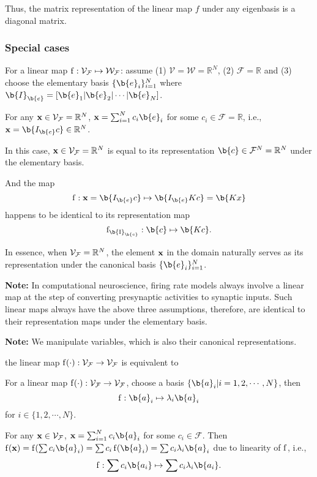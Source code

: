 Thus, the matrix representation of the linear map $f$ under any eigenbasis is a diagonal matrix.



\subsubsection{Special cases}

For a linear map $\operatorname{f}: \mathcal{V}_{\mathcal{F}} \mapsto \mathcal{W}_{\mathcal{F}}$: assume (1) $\mathcal{V} = \mathcal{W} = \mathbb{R}^N$, (2) $\mathcal{F} = \mathbb{R}$ and (3) choose the elementary basis $\{\b{e}_i\}_{i=1}^N$ where $\b{I}_{\b{e}} = \left[\b{e}_1 | \b{e}_2 | \cdots | \b{e}_N \right]$.

For any $\mathbf{x} \in \mathcal{V}_{\mathcal{F}} = \mathbb{R}^N$, $\x =\sum_{i=1}^{N} c_i\b{e}_i$ for some $c_i \in \mathcal{F} = \mathbb{R}$, i.e., $\x = \b{I_{\b{e}}c} \in \mathbb{R}^N$. 
    
In this case, $\mathbf{x} \in \mathcal{V}_{\mathcal{F}} = \mathbb{R}^N$ is equal to its representation $\b{c} \in \mathcal{F}^N = \mathbb{R}^N$ under the elementary basis.  
    
And the map
$$\f: \x = \b{I_{\b{e}}c} \mapsto  \b{I_{\b{e}}Kc} = \b{Kx}$$
happens to be identical to its representation map
$$\operatorname{f_{\b{I}_{\b{e}}}}: \b{c} \mapsto  \b{Kc}.$$
    
In essence, when $\mathcal{V}_{\mathcal{F}} = \mathbb{R}^N$, the element $\mathbf{x}$ in the domain naturally serves as its representation under the canonical basis $\{\b{e}_i\}_{i=1}^N$.
    
\textbf{Note:} In computational neuroscience, firing rate models always involve a linear map at the step of converting presynaptic activities to synaptic inputs. Such linear maps always have the above three assumptions, therefore, are identical to their representation maps under the elementary basis.
    
\textbf{Note:} We manipulate variables, which is also their canonical representations.




the linear map $\operatorname{f}(\cdot): \mathcal{V}_{\mathcal{F}} \to \mathcal{V}_{\mathcal{F}}$ is equivalent to


For a linear map $\operatorname{f}(\cdot): \mathcal{V}_{\mathcal{F}} \to \mathcal{V}_{\mathcal{F}}$, choose a basis $\{\b{a}_i| i=1,2,\cdots,N\}$, then 
$$\f: \b{a}_i \mapsto \lambda_i \b{a}_i$$
for $i \in \{1,2,\cdots,N\}$. 

For any $\mathbf{x} \in \mathcal{V}_{\mathcal{F}}$,  $\x =\sum_{i=1}^{N} c_i\b{a}_i$ for some $c_i \in \mathcal{F}$. 
Then $\f(\x) = \f(\sum c_i\b{a}_i) = \sum c_i \f(\b{a}_i) = \sum c_i \lambda_i \b{a}_i$ 
due to linearity of $\operatorname{f}$, i.e.,
$$\f: \sum c_i\b{a_i} \mapsto \sum c_i \lambda_i \b{a_i}.$$



